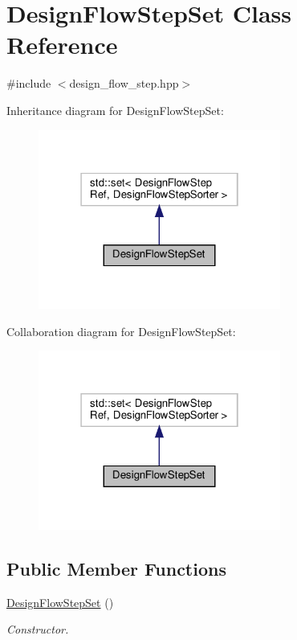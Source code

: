 \hypertarget{classDesignFlowStepSet}{}\section{Design\+Flow\+Step\+Set Class Reference}
\label{classDesignFlowStepSet}


{\ttfamily \#include $<$design\+\_\+flow\+\_\+step.\+hpp$>$}



Inheritance diagram for Design\+Flow\+Step\+Set\+:
\nopagebreak
\begin{figure}[H]
\begin{center}
\leavevmode
\includegraphics[width=226pt]{dc/d09/classDesignFlowStepSet__inherit__graph}
\end{center}
\end{figure}


Collaboration diagram for Design\+Flow\+Step\+Set\+:
\nopagebreak
\begin{figure}[H]
\begin{center}
\leavevmode
\includegraphics[width=226pt]{d0/dea/classDesignFlowStepSet__coll__graph}
\end{center}
\end{figure}
\subsection*{Public Member Functions}
\begin{DoxyCompactItemize}
\item 
\hyperlink{classDesignFlowStepSet_a3b7680ef212ca85887d1f6cd08ef7867}{Design\+Flow\+Step\+Set} ()
\begin{DoxyCompactList}\small\item\em Constructor. \end{DoxyCompactList}\end{DoxyCompactItemize}


